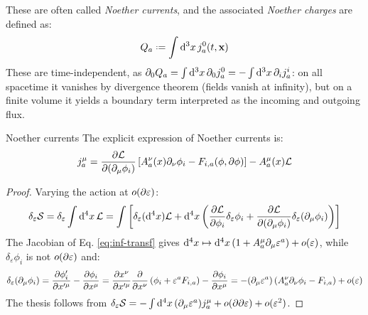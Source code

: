 These are often called \textit{Noether currents}, and the associated \textit{Noether charges} are defined as:
\begin{equation}
  Q_a \defeq \int \dd^3 x\, j^0_a(t,\ve{x})
\end{equation}
These are time-independent, as $ \partial_0 Q_a = \int \mathrm{d}^3 x\, \partial_0 j^0_a = - \int \mathrm{d}^3 x\, \partial_i j^i_a $: on all spacetime it vanishes by divergence theorem (fields vanish at infinity), but on a finite volume it yields a boundary term interpreted as the incoming and outgoing flux.

\begin{proposition}{Noether currents}{}
  The explicit expression of Noether currents is:
  \begin{equation}
    j^\mu_a = \frac{\partial \mathcal{L}}{\partial (\partial_\mu \phi_i)} \left[ A^\nu_a(x) \partial_\nu \phi_i - F_{i,a}(\phi, \partial \phi) \right] - A^\mu_a(x) \mathcal{L}
    \label{eq:noether-current}
  \end{equation}

  \tcblower

  \begin{proof}
    Varying the action at $ o(\partial \varepsilon) $:
    \begin{equation*}
        \delta_\varepsilon \mathcal{S} = \delta_\varepsilon \int \mathrm{d}^4 x\, \mathcal{L} = \int \left[ \delta_\varepsilon (\mathrm{d}^4 x) \mathcal{L} + \mathrm{d}^4 x \left( \frac{\partial \mathcal{L}}{\partial \phi_i} \delta_\varepsilon \phi_i + \frac{\partial \mathcal{L}}{\partial (\partial_\mu \phi_i)} \delta_\varepsilon (\partial_\mu \phi_i) \right) \right]
    \end{equation*}
    The Jacobian of Eq. \ref{eq:inf-transf} gives $ \mathrm{d}^4 x \mapsto \mathrm{d}^4 x \left( 1 + A^\mu_a \partial_\mu \varepsilon^a \right) + o(\varepsilon) $, while $ \delta_\varepsilon \phi_i $ is not $ o(\partial \varepsilon) $ and:
    \begin{equation*}
      \delta_\varepsilon (\partial_\mu \phi_i) = \frac{\partial \phi'_i}{\partial x'^\mu} - \frac{\partial \phi_i}{\partial x^\mu} = \frac{\partial x^\nu}{\partial x'^\mu} \frac{\partial}{\partial x^\nu} \left( \phi_i + \varepsilon^a F_{i,a} \right) - \frac{\partial \phi_i}{\partial x^\mu} = - (\partial_\mu \varepsilon^a) \left( A^\nu_a \partial_\nu \phi_i - F_{i,a} \right) + o(\varepsilon)
    \end{equation*}
    The thesis follows from $ \delta_\varepsilon \mathcal{S} = - \int \mathrm{d}^4 x\, (\partial_\mu \varepsilon^a) j^\mu_a + o(\partial \partial \varepsilon) + o(\varepsilon^2) $.
  \end{proof}
\end{proposition}


